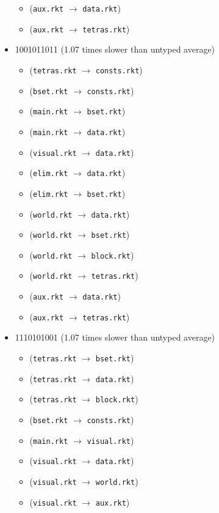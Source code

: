 \documentclass{article}
\newcommand{\mono}[1]{\texttt{#1}}
\begin{document}
\begin{itemize}
\begin{itemize}
  \item (\mono{aux.rkt} $\rightarrow$ \mono{data.rkt})
  \item (\mono{aux.rkt} $\rightarrow$ \mono{tetras.rkt})
  \end{itemize}
\item 1001011011 (1.07 times slower than untyped average)
  \begin{itemize}
  \item (\mono{tetras.rkt} $\rightarrow$ \mono{consts.rkt})
  \item (\mono{bset.rkt} $\rightarrow$ \mono{consts.rkt})
  \item (\mono{main.rkt} $\rightarrow$ \mono{bset.rkt})
  \item (\mono{main.rkt} $\rightarrow$ \mono{data.rkt})
  \item (\mono{visual.rkt} $\rightarrow$ \mono{data.rkt})
  \item (\mono{elim.rkt} $\rightarrow$ \mono{data.rkt})
  \item (\mono{elim.rkt} $\rightarrow$ \mono{bset.rkt})
  \item (\mono{world.rkt} $\rightarrow$ \mono{data.rkt})
  \item (\mono{world.rkt} $\rightarrow$ \mono{bset.rkt})
  \item (\mono{world.rkt} $\rightarrow$ \mono{block.rkt})
  \item (\mono{world.rkt} $\rightarrow$ \mono{tetras.rkt})
  \item (\mono{aux.rkt} $\rightarrow$ \mono{data.rkt})
  \item (\mono{aux.rkt} $\rightarrow$ \mono{tetras.rkt})
  \end{itemize}
\item 1110101001 (1.07 times slower than untyped average)
  \begin{itemize}
  \item (\mono{tetras.rkt} $\rightarrow$ \mono{bset.rkt})
  \item (\mono{tetras.rkt} $\rightarrow$ \mono{data.rkt})
  \item (\mono{tetras.rkt} $\rightarrow$ \mono{block.rkt})
  \item (\mono{bset.rkt} $\rightarrow$ \mono{consts.rkt})
  \item (\mono{main.rkt} $\rightarrow$ \mono{visual.rkt})
  \item (\mono{visual.rkt} $\rightarrow$ \mono{data.rkt})
  \item (\mono{visual.rkt} $\rightarrow$ \mono{world.rkt})
  \item (\mono{visual.rkt} $\rightarrow$ \mono{aux.rkt})

\end{itemize}
\end{itemize}
\end{document}
